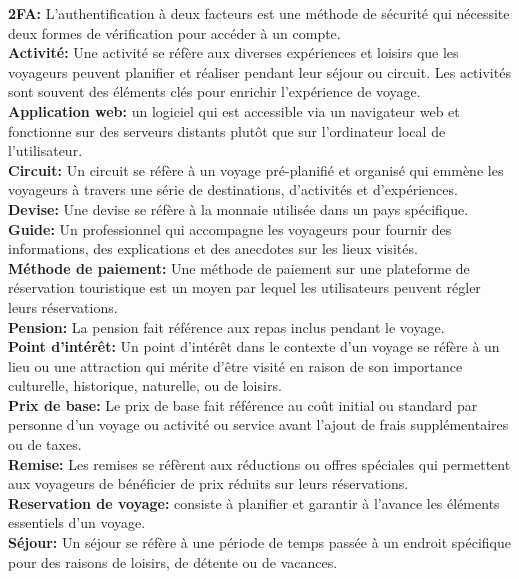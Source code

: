 \documentclass[12pt]{report}
\begin{document}
			\textbf{2FA:} L’authentification à deux facteurs est une méthode de sécurité qui nécessite deux formes de vérification pour accéder à un compte.\\
			\textbf{Activité:} Une activité se réfère aux diverses expériences et loisirs que les voyageurs peuvent planifier et réaliser pendant leur séjour ou circuit. Les activités sont souvent des éléments clés pour enrichir l'expérience de voyage.\\
			\textbf{Application web:} un logiciel qui est accessible via un navigateur web et fonctionne sur des serveurs distants plutôt que sur l'ordinateur local de l'utilisateur.\\
			\textbf{Circuit:} Un circuit se réfère à un voyage pré-planifié et organisé qui emmène les voyageurs à travers une série de destinations, d'activités et d'expériences.\\
			\textbf{Devise:} Une devise se réfère à la monnaie utilisée dans un pays spécifique.\\
			\textbf{Guide:} Un professionnel qui accompagne les voyageurs pour fournir des informations, des explications et des anecdotes sur les lieux visités.\\
			\textbf{Méthode de paiement:} Une méthode de paiement sur une plateforme de réservation touristique est un moyen par lequel les utilisateurs peuvent régler leurs réservations.\\
			\textbf{Pension:} La pension fait référence aux repas inclus pendant le voyage.\\
			\textbf{Point d'intérêt:} Un point d'intérêt dans le contexte d'un voyage se réfère à un lieu ou une attraction qui mérite d'être visité en raison de son importance culturelle, historique, naturelle, ou de loisirs.\\
			\textbf{Prix de base:} Le prix de base fait référence au coût initial ou standard par personne d'un voyage ou activité ou service avant l'ajout de frais supplémentaires ou de taxes.\\
			\textbf{Remise:} Les remises se réfèrent aux réductions ou offres spéciales qui permettent aux voyageurs de bénéficier de prix réduits sur leurs réservations.\\
			\textbf{Reservation de voyage:} consiste à planifier et garantir à l'avance les éléments essentiels d'un voyage.\\
			\textbf{Séjour:} Un séjour se réfère à une période de temps passée à un endroit spécifique pour des raisons de loisirs, de détente ou de vacances.\\
\end{document}
